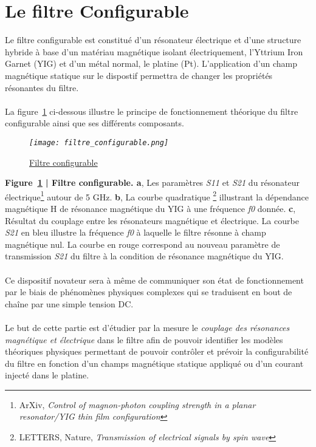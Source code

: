 \documentclass[12pt,fleqn]{book} %
\begin{document}
\part{Le filtre Configurable}
Le filtre configurable est constitué d’un résonateur électrique et d’une
structure hybride à base d’un matériau magnétique isolant électriquement, l’Yttrium
Iron Garnet (YIG) et d’un métal normal, le platine (Pt). L’application d’un champ
magnétique statique sur le dispostif permettra de changer les propriétés résonantes du
filtre.
~\\\\La figure~\underline{\color{blue}\ref{filtre}} ci-dessous illustre le principe de fonctionnement théorique du filtre configurable ainsi que ses différents composants.
\begin{figure}[H]
	\centering
	\itshape
	\texttt{[image: filtre\_configurable.png]}
	\caption{\label{filtre} \underline{Filtre configurable}}
\end{figure}
\noindent\footnotesize  \textbf{Figure~\underline{\color{blue}\ref{filtre}} | Filtre configurable. a}, Les paramètres \emph{S11} et \emph{S21} du résonateur électrique\footnote{ArXiv, \emph{Control of magnon-photon coupling strength in a planar resonator\slash YIG thin film configuration}} autour de 5 GHz. \textbf{b}, La courbe quadratique \footnote{LETTERS, Nature, \emph{Transmission of electrical signals by spin wave}} illustrant la dépendance magnétique H de résonance magnétique du YIG à une fréquence \emph{f0} donnée. \textbf{c}, Résultat du couplage entre les résonateurs magnétique et électrique\footnotemark[2]. La courbe \emph{S21} en bleu illustre la fréquence \emph{f0} à laquelle le filtre résonne à champ magnétique nul. La courbe en rouge correspond au nouveau paramètre de transmission \emph{S21} du filtre à la condition de résonance magnétique du YIG. 
~\\\\
\normalsize Ce dispositif novateur sera à même de communiquer son état de fonctionnement par le
biais de phénomènes physiques complexes qui se traduisent en bout de chaîne par une simple tension
DC.
~\\\\Le but de cette partie est d'étudier par la mesure le \emph{couplage des résonances magnétique et électrique} dans le filtre afin de pouvoir identifier les modèles théoriques physiques permettant de pouvoir contrôler et prévoir la configurabilité du filtre en fonction d'un champs magnétique statique appliqué ou d'un courant injecté dans le platine.
\end{document}

